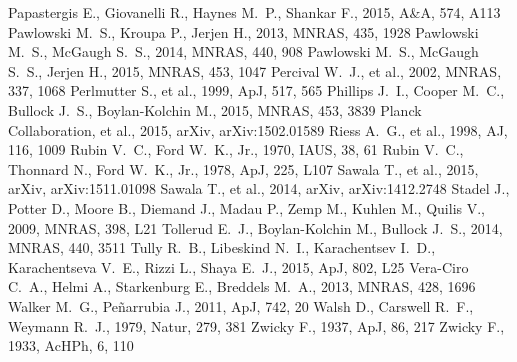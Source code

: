 \documentclass[a4wide,12pt]{book}
\begin{document}
\begin{thebibliography}{}
 Papastergis E., Giovanelli R., Haynes M.~P., Shankar F., 2015, A\&A, 574, A113 
 Pawlowski M.~S., Kroupa P., Jerjen H., 2013, MNRAS, 435, 1928 
 Pawlowski M.~S., McGaugh S.~S., 2014, MNRAS, 440, 908 
 Pawlowski M.~S., McGaugh S.~S., Jerjen H., 2015, MNRAS, 453, 1047 
 Percival W.~J., et al., 2002, MNRAS, 337, 
1068 
 Perlmutter S., et al., 1999, ApJ, 517, 565 
 Phillips J.~I., Cooper M.~C., Bullock 
J.~S., Boylan-Kolchin M., 2015, MNRAS, 453, 3839 
 Planck Collaboration, et al., 2015, arXiv, 
arXiv:1502.01589 
Riess A.~G., et al., 1998, AJ, 116, 1009 
 Rubin V.~C., Ford W.~K., Jr., 1970, IAUS, 38, 61
 Rubin V.~C., Thonnard N., Ford W.~K., Jr., 1978, ApJ, 225, L107 
Sawala T., et al., 2015, arXiv, arXiv:1511.01098 
Sawala T., et al., 2014, arXiv, arXiv:1412.2748 
Stadel J., Potter D., Moore B., Diemand J., Madau P., Zemp M., Kuhlen M., 
Quilis V., 2009, MNRAS, 398, L21 
 Tollerud E.~J., Boylan-Kolchin M., Bullock J.~S., 2014, MNRAS, 440, 3511 
Tully R.~B., Libeskind N.~I., Karachentsev I.~D., Karachentseva V.~E., 
Rizzi L., Shaya E.~J., 2015, ApJ, 802, L25
 Vera-Ciro C.~A., Helmi A., Starkenburg E., 
Breddels M.~A., 2013, MNRAS, 428, 1696 
 Walker M.~G., Pe{\~n}arrubia J., 2011, ApJ, 742, 20  
 Walsh D., Carswell R.~F., Weymann R.~J., 1979, Natur, 279, 381 
 Zwicky 
F., 1937, ApJ, 86, 217 
 Zwicky 
F., 1933, AcHPh, 6, 110
\end{thebibliography}
\end{document}
